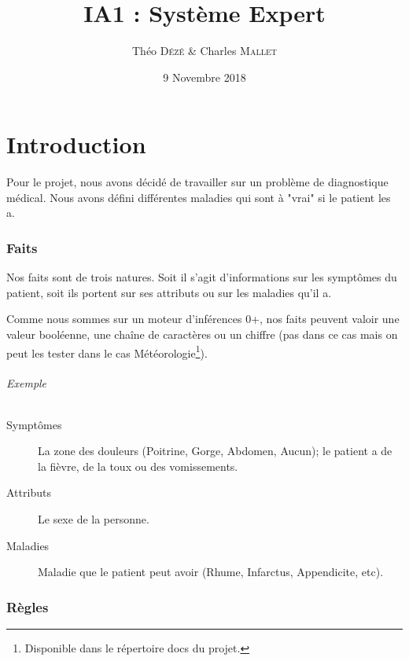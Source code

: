 \documentclass[a4paper, 11pt]{article}
\begin{document}
\title{IA1 : Système Expert}
\author{Théo \textsc{Dézé}  \& Charles \textsc {Mallet}}
\date{9 Novembre 2018} 

\maketitle

\tableofcontents

\pagebreak

\part{Introduction}

Pour le projet, nous avons décidé de travailler sur un problème de diagnostique médical. Nous avons défini différentes maladies qui sont à "vrai" si le patient les a.

\section{Faits}

Nos faits sont de trois natures. Soit il s'agit d'informations sur les symptômes du patient, soit ils portent sur ses attributs ou sur les maladies qu'il a. 

Comme nous sommes sur un moteur d'inférences 0+, nos faits peuvent valoir une valeur booléenne, une chaîne de caractères ou un chiffre (pas dans ce cas mais on peut les tester dans le cas Météorologie\footnote{Disponible dans le répertoire docs du projet.}).

\paragraph{Exemple}

\begin{description}
    \item[Symptômes] La zone des douleurs (Poitrine, Gorge, Abdomen, Aucun); le patient a de la fièvre, de la toux ou des vomissements.
    \item[Attributs] Le sexe de la personne.
    \item[Maladies] Maladie que le patient peut avoir (Rhume, Infarctus, Appendicite, etc).
\end{description}

\section{Règles}
\end{document}
